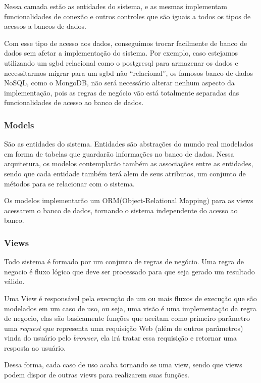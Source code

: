 Nessa camada estão as entidades do sistema, e as mesmas implementam 
funcionalidades de conexão e outros controles que são iguais a todos os tipos de 
acessos a bancos de dados. 

Com esse tipo de acesso aos dados, conseguimos trocar facilmente de banco de 
dados sem afetar a implementação do sistema. Por exemplo, caso estejamos 
utilizando um sgbd relacional como o postgresql para armazenar os dados e 
necessitarmos migrar para um sgbd não “relacional”, os famosos banco de dados 
NoSQL, como o MongoDB, não será necessário alterar nenhum aspecto da 
implementação,  pois as regras de negócio vão está totalmente separadas das 
funcionalidades de acesso ao banco de dados.

\subsubsection{Models}
São as entidades do sistema. Entidades são abstrações do mundo real modelados em 
forma de tabelas que guardarão informações no banco de dados. Nessa arquitetura, 
os modelos contemplarão também as associações entre as entidades, sendo que cada 
entidade também terá alem de seus atributos, um conjunto de métodos para se 
relacionar com o sistema.

Os modelos implementarão um ORM(Object-Relational Mapping) para as views 
acessarem o banco de dados, tornando o sistema independente do acesso ao banco. 

\subsubsection{Views}
Todo sistema é formado por um conjunto de regras de negócio. Uma regra de 
negocio é fluxo lógico que deve ser processado para que seja gerado um resultado 
válido.

Uma View é responsável pela execução de um ou mais fluxos de execução que são 
modelados em um caso de uso, ou seja, uma visão é uma implementação da regra de 
negocio, elas são basicamente funções que aceitam como primeiro parâmetro uma 
\textit{request} que representa uma requisição Web (além de outros parâmetros) 
vinda do usuário pelo \textit{browser}, ela irá tratar essa requisição e 
retornar uma resposta ao usuário.

Dessa forma, cada caso de uso acaba tornando se uma view, sendo que views podem 
dispor de outras views para realizarem suas funções. 

